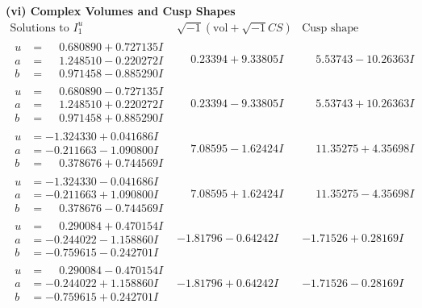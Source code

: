 \documentclass[1p]{elsarticle_modified}
\theoremstyle{definition}
\newcommand{\I}{\sqrt{-1}}
\begin{document}
\newpage\flushleft \textbf{(vi) Complex Volumes and Cusp Shapes}
$$\begin{array}{c|c|c}  
\text{Solutions to }I^u_{1}& \I (\text{vol} + \sqrt{-1}CS) & \text{Cusp shape}\\
 \hline 
\begin{aligned}
u &= \phantom{-}0.680890 + 0.727135 I \\
a &= \phantom{-}1.248510 - 0.220272 I \\
b &= \phantom{-}0.971458 - 0.885290 I\end{aligned}
 & \phantom{-}0.23394 + 9.33805 I & \phantom{-}5.53743 - 10.26363 I \\ \hline\begin{aligned}
u &= \phantom{-}0.680890 - 0.727135 I \\
a &= \phantom{-}1.248510 + 0.220272 I \\
b &= \phantom{-}0.971458 + 0.885290 I\end{aligned}
 & \phantom{-}0.23394 - 9.33805 I & \phantom{-}5.53743 + 10.26363 I \\ \hline\begin{aligned}
u &= -1.324330 + 0.041686 I \\
a &= -0.211663 - 1.090800 I \\
b &= \phantom{-}0.378676 + 0.744569 I\end{aligned}
 & \phantom{-}7.08595 - 1.62424 I & \phantom{-}11.35275 + 4.35698 I \\ \hline\begin{aligned}
u &= -1.324330 - 0.041686 I \\
a &= -0.211663 + 1.090800 I \\
b &= \phantom{-}0.378676 - 0.744569 I\end{aligned}
 & \phantom{-}7.08595 + 1.62424 I & \phantom{-}11.35275 - 4.35698 I \\ \hline\begin{aligned}
u &= \phantom{-}0.290084 + 0.470154 I \\
a &= -0.244022 - 1.158860 I \\
b &= -0.759615 - 0.242701 I\end{aligned}
 & -1.81796 - 0.64242 I & -1.71526 + 0.28169 I \\ \hline\begin{aligned}
u &= \phantom{-}0.290084 - 0.470154 I \\
a &= -0.244022 + 1.158860 I \\
b &= -0.759615 + 0.242701 I\end{aligned}
 & -1.81796 + 0.64242 I & -1.71526 - 0.28169 I \\ \hline\begin{aligned}

\end{aligned}
\end{array}$$
\end{document}
